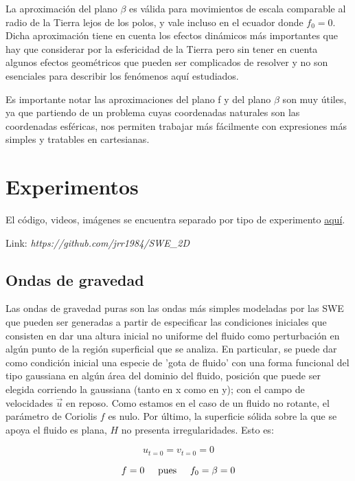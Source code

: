 \documentclass[12pt,dvipsnames]{exam}
\begin{document}
La aproximación del plano $\beta$ es válida para movimientos de escala comparable al radio de la Tierra lejos de los polos, y vale incluso en el ecuador donde $f_{0}=0$. Dicha aproximación tiene en cuenta los efectos dinámicos más importantes que hay que considerar por la esfericidad de la Tierra pero sin tener en cuenta algunos efectos geométricos que pueden ser complicados de resolver y no son esenciales para describir los fenómenos aquí estudiados.

Es importante notar las aproximaciones del plano f y del plano $\beta$ son muy útiles, ya que partiendo de un problema cuyas coordenadas naturales son las coordenadas esféricas, nos permiten trabajar más fácilmente con expresiones más simples y tratables en cartesianas.

\section{Experimentos}

El código, videos, imágenes se encuentra separado por tipo de experimento \href{https://github.com/jrr1984/SWE_2D}{aquí}. 

Link: \textit{https://github.com/jrr1984/SWE\_2D}
\subsection{Ondas de gravedad}

Las ondas de gravedad puras son las ondas más simples modeladas por las SWE que pueden ser generadas a partir de especificar las condiciones iniciales que consisten en dar una altura inicial no uniforme del fluido como perturbación en algún punto de la región superficial que se analiza. En particular, se puede dar como condición inicial una especie de 'gota de fluido' con una forma funcional del tipo gaussiana en algún área del dominio del fluido, posición que puede ser elegida corriendo la gaussiana (tanto en x como en y); con el campo de velocidades $\vec{u}$ en reposo. Como estamos en el caso de un fluido no rotante, el parámetro de Coriolis $f$ es nulo. Por último, la superficie sólida sobre la que se apoya el fluido es plana, $H$ no presenta irregularidades. Esto es:

\begin{equation*}
    u_{t=0} = v_{t=0} = 0
\end{equation*}


\begin{equation*}
    f = 0 \hspace{0.5cm} \text{pues} \hspace{0.5cm} f_{0} = \beta = 0
\end{equation*}
\end{document}
